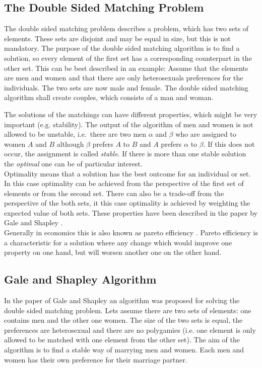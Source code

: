 \label{theory}
\subsection{The Double Sided Matching Problem}
The double sided matching problem describes a problem, which has two sets of elements.
These sets are disjoint and may be equal in size, but this is not mandatory.
The purpose of the double sided matching algorithm is to find a solution, so every element of the first set has a corresponding counterpart in the other set. This can be best described in an example:
Assume that the elements are men and women and that there are only heterosexuals preferences for the individuals.
The two sets are now male and female.
The double sided matching algorithm shall create couples, which consists of a man and woman.

The solutions of the matchings can have different properties, which might be very important (e.g. stability).
The output of the algorithm of men and women is not allowed to be unstable, i.e.\ there are two men $\alpha$ and $\beta$ who are assigned to women $A$ and $B$ although $\beta$ prefers $A$ to $B$ and $A$ prefers $\alpha$ to $\beta$.
If this does not occur, the assignment is called \textit{stable}.
If there is more than one stable solution the \textit{optimal} one can be of particular interest.\\ 
Optimality means that a solution has the best outcome for an individual or set.
In this case optimality can be achieved from the perspective of the first set of elements or from the second set.
There can also be a trade-off from the perspective of the both sets, it this case optimality is achieved by weighting the expected value of both sets.
These properties have been described in the paper by Gale and Shapley \cite{gale62a}.\\
Generally in economics this is also known as pareto efficiency \cite[p. 46]{9780199297818}. 
Pareto efficiency is a characteristic for a solution where any change which would improve one property on one hand, but will worsen another one on the other hand.


\subsection{Gale and Shapley Algorithm}

In the paper of Gale and Shapley \cite{gale62a} an algorithm was proposed for solving the double sided matching problem.
Lets assume there are two sets of elements: one contains men and the other one women.
The size of the two sets is equal, the preferences are heterosexual and there are no polygamies (i.e. one element is only allowed to be matched with one element from the other set).
The aim of the algorithm is to find a stable way of marrying men and women.
Each men and women has their own preference for their marriage partner.

